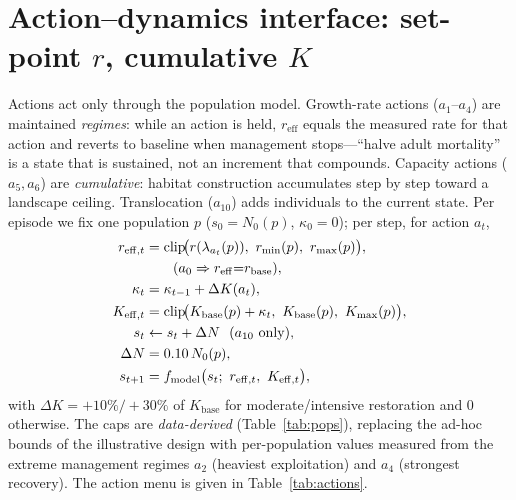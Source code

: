 \documentclass[11pt]{article}
\newcommand{\reff}{r_{\mathrm{eff}}}
\newcommand{\rbase}{r_{\mathrm{base}}}
\newcommand{\Kbase}{K_{\mathrm{base}}}
\newcommand{\rmax}{r_{\max}}
\newcommand{\rmin}{r_{\min}}
\newcommand{\Kmax}{K_{\max}}
\begin{document}
\section{Action--dynamics interface: set-point $r$, cumulative $K$}
Actions act only through the population model. Growth-rate actions ($a_1$--$a_4$)
are maintained \emph{regimes}: while an action is held, $\reff$ equals the measured
rate for that action and reverts to baseline when management stops---``halve adult
mortality'' is a state that is sustained, not an increment that compounds.
Capacity actions ($a_5,a_6$) are \emph{cumulative}: habitat construction
accumulates step by step toward a landscape ceiling. Translocation ($a_{10}$) adds
individuals to the current state. Per episode we fix one population $p$
($s_0{=}N_0(p)$, $\kappa_0{=}0$); per step, for action $a_t$,
\begin{align}
r_{\mathrm{eff},t}
&= \mathrm{clip}\!\big(r(\lambda_{a_t}(p)),\ \rmin(p),\ \rmax(p)\big), \notag\\
&\qquad (a_0\Rightarrow \reff{=}\rbase),\\
\kappa_t
&= \kappa_{t-1}+\Delta K(a_t), \notag\\
K_{\mathrm{eff},t}
&= \mathrm{clip}\!\big(\Kbase(p)+\kappa_t,\ \Kbase(p),\ \Kmax(p)\big),\\
s_t
&\leftarrow s_t+\Delta N\ \ (a_{10}\text{ only}), \notag\\
\Delta N
&=0.10\,N_0(p),\\
s_{t+1} &= f_{\mathrm{model}}\big(s_t;\ r_{\mathrm{eff},t},\ K_{\mathrm{eff},t}\big),
\end{align}
with $\Delta K=+10\%/+30\%$ of $\Kbase$ for moderate/intensive restoration and $0$
otherwise. The caps are \emph{data-derived} (Table~\ref{tab:pops}), replacing the
ad-hoc bounds of the illustrative design with per-population values measured from
the extreme management regimes $a_2$ (heaviest exploitation) and $a_4$ (strongest
recovery). The action menu is given in Table~\ref{tab:actions}.
\end{document}
